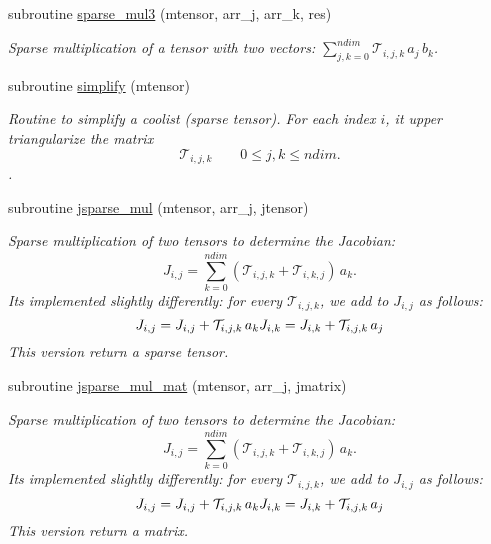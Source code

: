 \begin{DoxyCompactItemize}
subroutine \hyperlink{namespacetensor__def_af2cb03d54dfb5547017314a7d5ecd779}{sparse\+\_\+mul3} (mtensor, arr\+\_\+j, arr\+\_\+k, res)
\begin{DoxyCompactList}\small\item\em Sparse multiplication of a tensor with two vectors\+: ${\displaystyle \sum_{j,k=0}^{ndim}} \mathcal{T}_{i,j,k} \, a_j \,b_k$. \end{DoxyCompactList}\item 
subroutine \hyperlink{namespacetensor__def_a6b590b8ef8f8e8ce5638dcb08e6fe4f6}{simplify} (mtensor)
\begin{DoxyCompactList}\small\item\em Routine to simplify a coolist (sparse tensor). For each index $i$, it upper triangularize the matrix \[\mathcal{T}_{i,j,k} \qquad 0 \leq j,k \leq ndim.\]. \end{DoxyCompactList}\item 
subroutine \hyperlink{namespacetensor__def_a7b8ab1f82d103857f506b11c56ff444b}{jsparse\+\_\+mul} (mtensor, arr\+\_\+j, jtensor)
\begin{DoxyCompactList}\small\item\em Sparse multiplication of two tensors to determine the Jacobian\+: \[J_{i,j} = {\displaystyle \sum_{k=0}^{ndim}} \left( \mathcal{T}_{i,j,k} + \mathcal{T}_{i,k,j} \right) \, a_k.\] It\textquotesingle{}s implemented slightly differently\+: for every $\mathcal{T}_{i,j,k}$, we add to $J_{i,j}$ as follows\+: \[J_{i,j} = J_{i,j} + \mathcal{T}_{i,j,k} \, a_k \\ J_{i,k} = J_{i,k} + \mathcal{T}_{i,j,k} \, a_j\] This version return a sparse tensor. \end{DoxyCompactList}\item 
subroutine \hyperlink{namespacetensor__def_af2aaece65d0d7b093d5043d708e81c9e}{jsparse\+\_\+mul\+\_\+mat} (mtensor, arr\+\_\+j, jmatrix)
\begin{DoxyCompactList}\small\item\em Sparse multiplication of two tensors to determine the Jacobian\+: \[J_{i,j} = {\displaystyle \sum_{k=0}^{ndim}} \left( \mathcal{T}_{i,j,k} + \mathcal{T}_{i,k,j} \right) \, a_k.\] It\textquotesingle{}s implemented slightly differently\+: for every $\mathcal{T}_{i,j,k}$, we add to $J_{i,j}$ as follows\+: \[J_{i,j} = J_{i,j} + \mathcal{T}_{i,j,k} \, a_k \\ J_{i,k} = J_{i,k} + \mathcal{T}_{i,j,k} \, a_j\] This version return a matrix. \end{DoxyCompactList}\item 

\end{DoxyCompactItemize}
